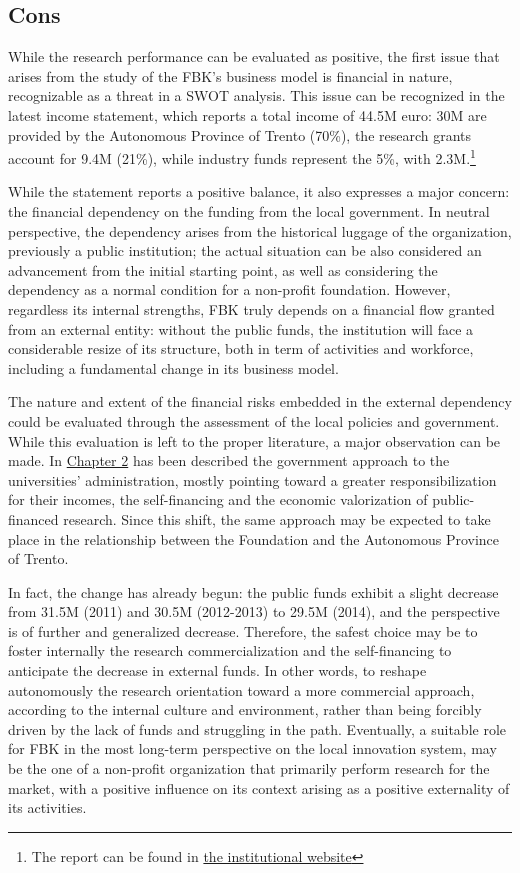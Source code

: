 \subsection{Cons}

While the research performance can be evaluated as positive, the first issue that arises from the study of the FBK's business model is financial in nature, recognizable as a threat in a SWOT analysis. This issue can be recognized in the latest income statement, which reports a total income of 44.5M euro: 30M are provided by the Autonomous Province of Trento (70\%), the research grants account for 9.4M (21\%), while industry funds represent the 5\%, with 2.3M.\footnote{The report can be found in \href{https://trasparenza.fbk.eu/Bilanci/Bilancio-preventivo-e-consuntivo}{the institutional website}}

While the statement reports a positive balance, it also expresses a major concern: the financial dependency on the funding from the local government. In neutral perspective, the dependency arises from the historical luggage of the organization, previously a public institution; the actual situation can be also considered an advancement from the initial starting point, as well as considering the dependency as a normal condition for a non-profit foundation. However, regardless its internal strengths, FBK truly depends on a financial flow granted from an external entity: without the public funds, the institution will face a considerable resize of its structure, both in term of activities and workforce, including a fundamental change in its business model.

The nature and extent of the financial risks embedded in the external dependency could be evaluated through the assessment of the local policies and government. While this evaluation is left to the proper literature, a major observation can be made. In \hyperref[Chapter2]{Chapter 2} has been described the government approach to the universities' administration, mostly pointing toward a greater responsibilization for their incomes, the self-financing and the economic valorization of public-financed research. Since this shift, the same approach may be expected to take place in the relationship between the Foundation and the Autonomous Province of Trento.

In fact, the change has already begun: the public funds exhibit a slight decrease from 31.5M (2011) and 30.5M (2012-2013) to 29.5M (2014), and the perspective is of further and generalized decrease. Therefore, the safest choice may be to foster internally the research commercialization and the self-financing to anticipate the decrease in external funds. In other words, to reshape autonomously the research orientation toward a more commercial approach, according to the internal culture and environment, rather than being forcibly driven by the lack of funds and struggling in the path. Eventually, a suitable role for FBK in the most long-term perspective on the local innovation system, may be the one of a non-profit organization that primarily perform research for the market, with a positive influence on its context arising as a positive externality of its activities.

